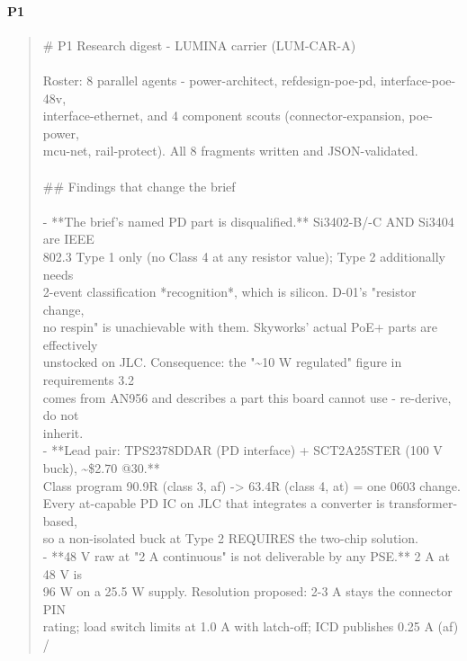 \documentclass[11pt,a4paper]{article}
\begin{document}
\paragraph*{P1}
\begin{quote}\small\ttfamily\raggedright
\# P1 Research digest - LUMINA carrier (LUM-CAR-A)\\
~\\
Roster: 8 parallel agents - power-architect, refdesign-poe-pd, interface-poe-48v,\\
interface-ethernet, and 4 component scouts (connector-expansion, poe-power,\\
mcu-net, rail-protect). All 8 fragments written and JSON-validated.\\
~\\
\#\# Findings that change the brief\\
~\\
- {*}{*}The brief's named PD part is disqualified.{*}{*} Si3402-B/-C AND Si3404 are IEEE\\
  802.3 Type 1 only (no Class 4 at any resistor value); Type 2 additionally needs\\
  2-event classification {*}recognition{*}, which is silicon. D-01's "resistor change,\\
  no respin" is unachievable with them. Skyworks' actual PoE+ parts are effectively\\
  unstocked on JLC. Consequence: the "\textasciitilde{}10 W regulated" figure in requirements 3.2\\
  comes from AN956 and describes a part this board cannot use - re-derive, do not\\
  inherit.\\
- {*}{*}Lead pair: TPS2378DDAR (PD interface) + SCT2A25STER (100 V buck), \textasciitilde{}\$2.70 @30.{*}{*}\\
  Class program 90.9R (class 3, af) -\textgreater{} 63.4R (class 4, at) = one 0603 change.\\
  Every at-capable PD IC on JLC that integrates a converter is transformer-based,\\
  so a non-isolated buck at Type 2 REQUIRES the two-chip solution.\\
- {*}{*}48 V raw at "2 A continuous" is not deliverable by any PSE.{*}{*} 2 A at 48 V is\\
  96 W on a 25.5 W supply. Resolution proposed: 2-3 A stays the connector PIN\\
  rating; load switch limits at 1.0 A with latch-off; ICD publishes 0.25 A (af) /\\

\end{quote}
\end{document}
